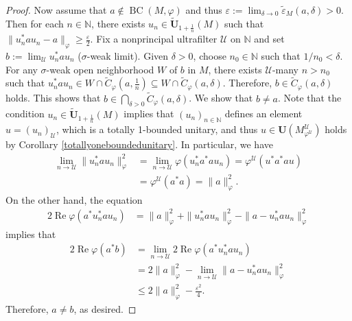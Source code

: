 \documentclass[12pt]{amsart}
\theoremstyle{definition}
\newcommand{\ep}{\varepsilon}
\def\cal{\mathcal}
\newcommand\cU{{\cal U}}
\def\BC{\operatorname{BC}}
\begin{document}
\begin{proof}
    Now assume that $a\notin \BC(M,\varphi)$ and thus $\ep:=\lim_{\delta\to 0}\tilde{\ep}_{M}(a,\delta)>0$. Then for each $n\in \mathbb{N}$, there exists $u_n\in \tilde{\mathbf{U}}_{1+\frac{1}{n}}(M)$ such that $\|u_n^*au_n-a\|_{\varphi}\ge \frac{\ep}{2}$. Fix a nonprincipal ultrafilter $\cU$ on $\mathbb{N}$ and set $b:=\lim_{ \cU}u_n^*au_n$ ($\sigma$-weak limit). Given $\delta>0$, choose $n_0\in \mathbb{N}$ such that $1/n_0<\delta$. For any $\sigma$-weak open neighborhood $W$ of $b$ in $M$, there exists $\cU$-many $n>n_0$ such that $u_n^*au_n\in W\cap \widetilde{C}_{\varphi}(a,\frac{1}{n})\subseteq W\cap \widetilde{C}_{\varphi}(a,\delta)$. Therefore, $b\in \widetilde{C}_{\varphi}(a,\delta)$ holds.  This shows that $b\in \bigcap_{\delta>0}\widetilde{C}_{\varphi}(a,\delta)$. We show that $b\neq a$. Note that the condition $u_n\in \tilde{\mathbf{U}}_{1+\frac{1}{n}}(M)$ implies that $(u_n)_{n\in \mathbb{N}}$ defines an element $u=(u_n)_{\cU}$, which is a totally 1-bounded unitary, and thus $u\in \mathbf{U}(M^{\cU}_{\varphi^{\cU}})$ holds by Corollary \ref{totallyoneboundedunitary}. In particular, we have 
    \begin{align*}
        \lim_{n\to \cU}\|u_n^*au_n\|_{\varphi}^2&=\lim_{n\to \cU}\varphi(u_n^*a^*au_n)=\varphi^{\cU}(u^*a^*au)\\
        &=\varphi^{\cU}(a^*a)=\|a\|_{\varphi}^2.
    \end{align*}
    On the other hand, the equation 
    \begin{align*}
        2\operatorname{Re}\varphi(a^*u_n^*au_n)&=\|a\|_{\varphi}^2+\|u_n^*au_n\|_{\varphi}^2-\|a-u_n^*au_n\|_{\varphi}^2
    \end{align*}
    implies that 
    \begin{align*}
        2\operatorname{Re}\varphi(a^*b)&=\lim_{n\to \cU}2\operatorname{Re}\varphi(a^*u_n^*au_n)\\
        &=2\|a\|_{\varphi}^2-\lim_{n\to \cU}\|a-u_n^*au_n\|_{\varphi}^2\\
        &\le 2\|a\|_{\varphi}^2-\frac{\ep^2}{4}.
    \end{align*}
    Therefore, $a\neq b$, as desired. 
\end{proof}
\end{document}
